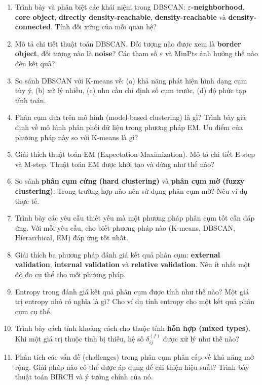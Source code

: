 \documentclass[10pt]{article}
\begin{document}
\begin{enumerate}[leftmargin=*, label=\textbf{Câu \arabic*.}]
    \item Trình bày và phân biệt các khái niệm trong DBSCAN: \textbf{$\varepsilon$-neighborhood}, \textbf{core object}, \textbf{directly density-reachable}, \textbf{density-reachable} và \textbf{density-connected}. Tính đối xứng của mỗi quan hệ?

    \item Mô tả chi tiết thuật toán DBSCAN. Đối tượng nào được xem là \textbf{border object}, đối tượng nào là \textbf{noise}? Các tham số $\varepsilon$ và MinPts ảnh hưởng thế nào đến kết quả?

    \item So sánh DBSCAN với K-means về: (a) khả năng phát hiện hình dạng cụm tùy ý, (b) xử lý nhiễu, (c) nhu cầu chỉ định số cụm trước, (d) độ phức tạp tính toán.

    \item Phân cụm dựa trên mô hình (model-based clustering) là gì? Trình bày giả định về mô hình phân phối dữ liệu trong phương pháp EM. Ưu điểm của phương pháp này so với K-means là gì?

    \item Giải thích thuật toán EM (Expectation-Maximization). Mô tả chi tiết E-step và M-step. Thuật toán EM được khởi tạo và dừng như thế nào?

    \item So sánh \textbf{phân cụm cứng (hard clustering)} và \textbf{phân cụm mờ (fuzzy clustering)}. Trong trường hợp nào nên sử dụng phân cụm mờ? Nêu ví dụ thực tế.

    \item Trình bày các yêu cầu thiết yếu mà một phương pháp phân cụm tốt cần đáp ứng. Với mỗi yêu cầu, cho biết phương pháp nào (K-means, DBSCAN, Hierarchical, EM) đáp ứng tốt nhất.

    \item Giải thích ba phương pháp đánh giá kết quả phân cụm: \textbf{external validation}, \textbf{internal validation} và \textbf{relative validation}. Nêu ít nhất một độ đo cụ thể cho mỗi phương pháp.

    \item Entropy trong đánh giá kết quả phân cụm được tính như thế nào? Một giá trị entropy nhỏ có nghĩa là gì? Cho ví dụ tính entropy cho một kết quả phân cụm cụ thể.

    \item Trình bày cách tính khoảng cách cho thuộc tính \textbf{hỗn hợp (mixed types)}. Khi một giá trị thuộc tính bị thiếu, hệ số $\delta_{ij}^{(f)}$ được xử lý như thế nào?

    \item Phân tích các vấn đề (challenges) trong phân cụm phân cấp về khả năng mở rộng. Giải pháp nào có thể được áp dụng để cải thiện hiệu suất? Trình bày thuật toán BIRCH và ý tưởng chính của nó.

\end{enumerate}
\end{document}

